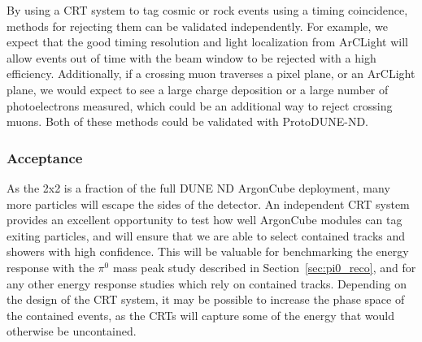By using a CRT system to tag cosmic or rock events using a timing coincidence, methods for rejecting them can be validated independently. For example, we expect that the good timing resolution and light localization from ArCLight will allow events out of time with the beam window to be rejected with a high efficiency. Additionally, if a crossing muon traverses a pixel plane, or an ArCLight plane, we would expect to see a large charge deposition or a large number of photoelectrons measured, which could be an additional way to reject crossing muons. Both of these methods could be validated with ProtoDUNE-ND.

\subsubsection{Acceptance}
As the 2x2 is a fraction of the full DUNE ND ArgonCube deployment, many more particles will escape the sides of the detector. An independent CRT system provides an excellent opportunity to test how well ArgonCube modules can tag exiting particles, and will ensure that we are able to select contained tracks and showers with high confidence. This will be valuable for benchmarking the energy response with the $\pi^{0}$ mass peak study described in Section~\ref{sec:pi0_reco}, and for any other energy response studies which rely on contained tracks. Depending on the design of the CRT system, it may be possible to increase the phase space of the contained events, as the CRTs will capture some of the energy that would otherwise be uncontained.
